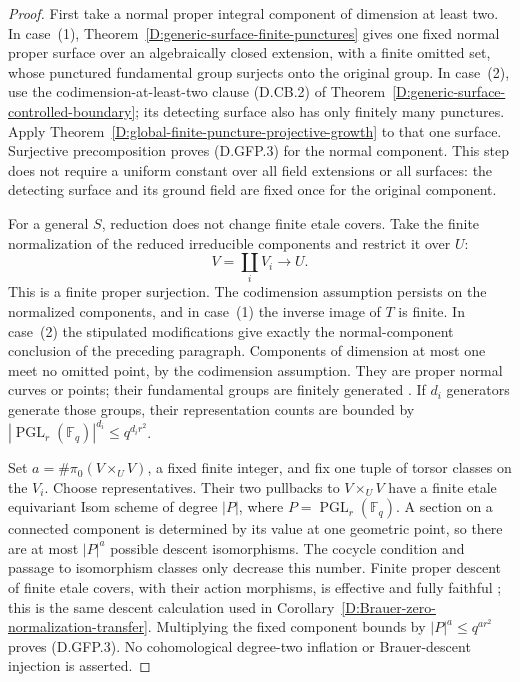 \begin{proof}
First take a normal proper integral component of dimension at
least two. In case~(1),
Theorem~\ref{D:generic-surface-finite-punctures} gives one fixed
normal proper surface over an algebraically closed extension,
with a finite omitted set, whose punctured fundamental group
surjects onto the original group. In case~(2), use the
codimension-at-least-two clause (D.CB.2) of
Theorem~\ref{D:generic-surface-controlled-boundary}; its detecting
surface also has only finitely many punctures. Apply
Theorem~\ref{D:global-finite-puncture-projective-growth} to that
one surface. Surjective precomposition proves (D.GFP.3) for the
normal component. This step does not require a uniform constant
over all field extensions or all surfaces: the detecting surface
and its ground field are fixed once for the original component.

For a general $S$, reduction does not change finite etale covers.
Take the finite normalization of the reduced irreducible
components and restrict it over $U$:
\[
                         V=\coprod_i V_i\longrightarrow U.
                                                               \tag{D.GFP.4}
\]
This is a finite proper surjection. The codimension assumption
persists on the normalized components, and in case~(1) the
inverse image of $T$ is finite. In case~(2) the stipulated
modifications give exactly the normal-component conclusion
of the preceding paragraph. Components of dimension at most
one meet no omitted point, by the codimension assumption.
They are proper normal curves or points; their fundamental groups
are finitely generated
\citep[Expose~X, Theorem~2.6, pp.~272--273]{C_SGA1}.
If $d_i$ generators generate those groups, their representation counts
are bounded by
$|\operatorname{PGL}_r(\mathbb F_q)|^{d_i}\leq q^{d_i r^2}$.

Set $a=\#\pi_0(V\times_U V)$, a fixed finite integer, and fix
one tuple of torsor classes on the $V_i$. Choose representatives.
Their two pullbacks to $V\times_U V$ have a finite etale
equivariant Isom scheme of degree
$|P|$, where $P=\operatorname{PGL}_r(\mathbb F_q)$.
A section on a connected component is determined by its value
at one geometric point, so there are at most $|P|^a$ possible
descent isomorphisms. The cocycle condition and passage to
isomorphism classes only decrease this number. Finite proper
descent of finite etale covers, with their action morphisms,
is effective and fully faithful
\citep[Expose~IX, Theorem~4.7]{C_SGA1}; this is the same descent
calculation used in
Corollary~\ref{D:Brauer-zero-normalization-transfer}.
Multiplying the fixed component bounds by
$|P|^a\leq q^{ar^2}$ proves (D.GFP.3). No cohomological
degree-two inflation or Brauer-descent injection is asserted.
\end{proof}

